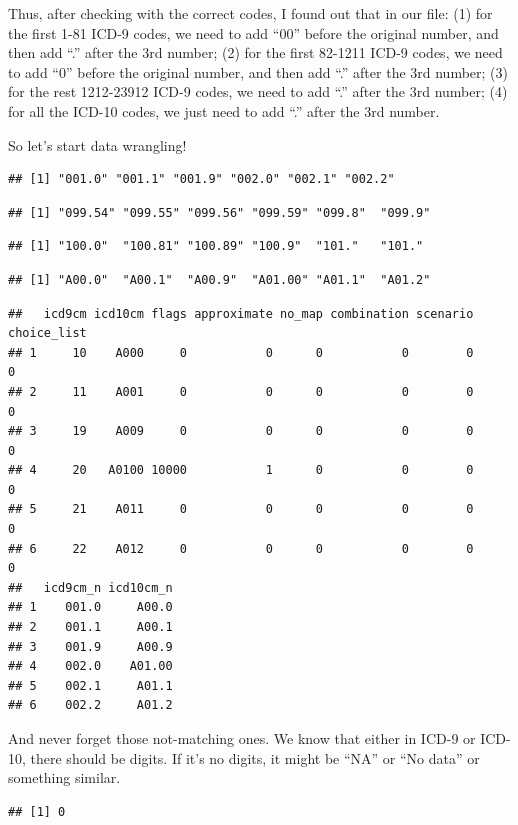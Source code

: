 \documentclass[
]{article}
\begin{document}
Thus, after checking with the correct codes, I found out that in our
file: (1) for the first 1-81 ICD-9 codes, we need to add ``00'' before
the original number, and then add ``.'' after the 3rd number; (2) for
the first 82-1211 ICD-9 codes, we need to add ``0'' before the original
number, and then add ``.'' after the 3rd number; (3) for the rest
1212-23912 ICD-9 codes, we need to add ``.'' after the 3rd number; (4)
for all the ICD-10 codes, we just need to add ``.'' after the 3rd
number.

So let's start data wrangling!

\begin{verbatim}
## [1] "001.0" "001.1" "001.9" "002.0" "002.1" "002.2"
\end{verbatim}

\begin{verbatim}
## [1] "099.54" "099.55" "099.56" "099.59" "099.8"  "099.9"
\end{verbatim}

\begin{verbatim}
## [1] "100.0"  "100.81" "100.89" "100.9"  "101."   "101."
\end{verbatim}

\begin{verbatim}
## [1] "A00.0"  "A00.1"  "A00.9"  "A01.00" "A01.1"  "A01.2"
\end{verbatim}

\begin{verbatim}
##   icd9cm icd10cm flags approximate no_map combination scenario choice_list
## 1     10    A000     0           0      0           0        0           0
## 2     11    A001     0           0      0           0        0           0
## 3     19    A009     0           0      0           0        0           0
## 4     20   A0100 10000           1      0           0        0           0
## 5     21    A011     0           0      0           0        0           0
## 6     22    A012     0           0      0           0        0           0
##   icd9cm_n icd10cm_n
## 1    001.0     A00.0
## 2    001.1     A00.1
## 3    001.9     A00.9
## 4    002.0    A01.00
## 5    002.1     A01.1
## 6    002.2     A01.2
\end{verbatim}

And never forget those not-matching ones. We know that either in ICD-9
or ICD-10, there should be digits. If it's no digits, it might be ``NA''
or ``No data'' or something similar.

\begin{verbatim}
## [1] 0
\end{verbatim}
\end{document}
